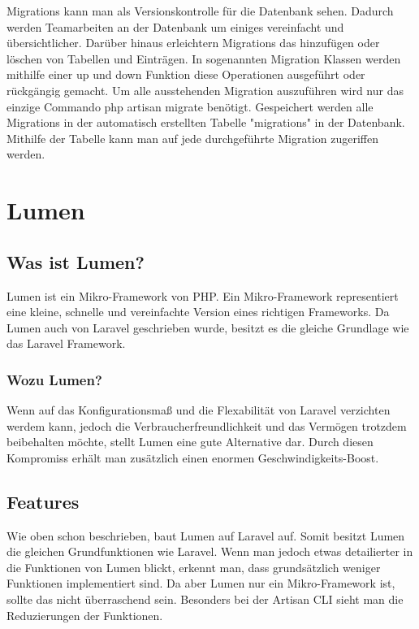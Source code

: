 Migrations\cite{Migration} kann man als Versionskontrolle für die Datenbank sehen. Dadurch werden Teamarbeiten an der Datenbank um einiges vereinfacht und übersichtlicher. Darüber hinaus erleichtern Migrations das hinzufügen oder löschen von Tabellen und Einträgen. In sogenannten Migration Klassen werden mithilfe einer up und down Funktion diese Operationen ausgeführt oder rückgängig gemacht. Um alle ausstehenden Migration auszuführen wird nur das einzige Commando php artisan migrate benötigt. Gespeichert werden alle Migrations in der automatisch erstellten Tabelle "migrations" in der Datenbank. Mithilfe der Tabelle kann man auf jede durchgeführte Migration zugeriffen werden.

\section{Lumen}

\subsection{Was ist Lumen?}

Lumen\cite{Lumen} ist ein Mikro-Framework von PHP. Ein Mikro-Framework representiert eine kleine, schnelle und vereinfachte Version eines richtigen Frameworks. Da Lumen auch von Laravel geschrieben wurde, besitzt es die gleiche Grundlage wie das Laravel Framework.

\subsubsection{Wozu Lumen?}

Wenn auf das Konfigurationsmaß und die Flexabilität von Laravel verzichten werdem kann, jedoch die Verbraucherfreundlichkeit und das Vermögen trotzdem beibehalten möchte, stellt Lumen eine gute Alternative dar. Durch diesen Kompromiss erhält man zusätzlich einen enormen Geschwindigkeits-Boost.

\subsection{Features}

Wie oben schon beschrieben, baut Lumen auf Laravel auf. Somit besitzt Lumen die gleichen Grundfunktionen wie Laravel. Wenn man jedoch etwas detailierter in die Funktionen von Lumen blickt, erkennt man, dass grundsätzlich weniger Funktionen implementiert sind. Da aber Lumen nur ein Mikro-Framework ist, sollte das nicht überraschend sein. Besonders bei der Artisan CLI sieht man die Reduzierungen der Funktionen.

